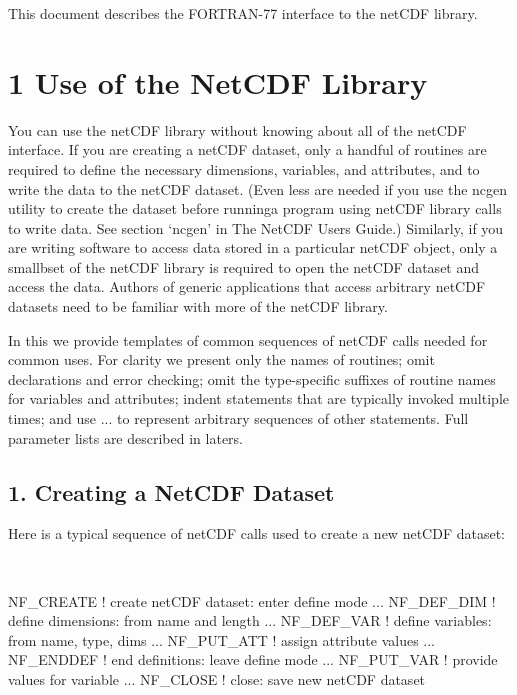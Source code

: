 This document describes the F\+O\+R\+T\+R\+A\+N-\/77 interface to the net\+C\+DF library.\hypertarget{nc_f77_interface_guide_f77_Use_of_the_NetCDF_Library}{}\section{1 Use of the Net\+C\+D\+F Library }\label{nc_f77_interface_guide_f77_Use_of_the_NetCDF_Library}
You can use the net\+C\+DF library without knowing about all of the net\+C\+DF interface. If you are creating a net\+C\+DF dataset, only a handful of routines are required to define the necessary dimensions, variables, and attributes, and to write the data to the net\+C\+DF dataset. (Even less are needed if you use the ncgen utility to create the dataset before runninga program using net\+C\+DF library calls to write data. See section ‘ncgen’ in The Net\+C\+DF Users Guide.) Similarly, if you are writing software to access data stored in a particular net\+C\+DF object, only a smallbset of the net\+C\+DF library is required to open the net\+C\+DF dataset and access the data. Authors of generic applications that access arbitrary net\+C\+DF datasets need to be familiar with more of the net\+C\+DF library.

In this we provide templates of common sequences of net\+C\+DF calls needed for common uses. For clarity we present only the names of routines; omit declarations and error checking; omit the type-\/specific suffixes of routine names for variables and attributes; indent statements that are typically invoked multiple times; and use ... to represent arbitrary sequences of other statements. Full parameter lists are described in laters.\hypertarget{nc_f77_interface_guide_f77_Creating_a_NetCDF_Dataset}{}\subsection{1. Creating a Net\+C\+D\+F Dataset }\label{nc_f77_interface_guide_f77_Creating_a_NetCDF_Dataset}
Here is a typical sequence of net\+C\+DF calls used to create a new net\+C\+DF dataset\+:

 

\begin{DoxyVerb}NF_CREATE           ! create netCDF dataset: enter define mode
     ...
   NF_DEF_DIM       ! define dimensions: from name and length
     ...
   NF_DEF_VAR       ! define variables: from name, type, dims
     ...
   NF_PUT_ATT       ! assign attribute values
     ...
NF_ENDDEF           ! end definitions: leave define mode
     ...
   NF_PUT_VAR       ! provide values for variable
     ...
NF_CLOSE            ! close: save new netCDF dataset
\end{DoxyVerb}


